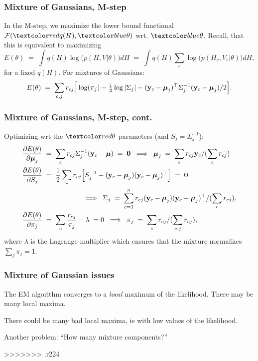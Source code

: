 \begin{frame}
\frametitle{Mixture of Gaussians, M-step}

In the M-step, we maximize the lower bound functional ${\cal
  F}(\Red{q(H)},\Blue{\theta})$ wrt. $\Blue{\theta}$. Recall, that this is 
equivalent to maximizing
%
\[
E(\theta)\;=\;\int q(H)\log\big(p(H,V|\theta)\big)dH\;=
\;\int q(H)\sum_c\log\big(p(H_c,V_c|\theta)\big)dH,
\]
%
for a fixed $q(H)$. For mixtures of Gaussians:
%
\[
E(\theta)\;=\;\sum_{c,j}r_{cj}\Big[\log(\pi_j)-\tfrac{1}{2}\log|\Sigma_j|
-(\mathbf y_c-{\boldsymbol{\mu}}_j)^\top\Sigma_j^{-1}(\mathbf y_c-{\boldsymbol{\mu}}_j)/2\Big].
\]
\end{frame}

\begin{frame}
\frametitle{Mixture of Gaussians, M-step, cont.}

Optimizing wrt the $\Red{\theta}$ parameters (and $S_j=\Sigma_j^{-1}$):
%
\[
\begin{split}
\frac{\partial E(\theta)}{\partial \bmu_j}\;&=\;\sum_c
r_{cj}\Sigma_j^{-1}(\bfy_c-\bmu)\;=\;{\bf 0}\;\;\Longrightarrow\;\;
\bmu_j\;=\;\sum_c r_{cj}\bfy_c/(\sum_c r_{cj})\\
\frac{\partial E(\theta)}{\partial
  S_j}\;&=\;\frac{1}{2}\sum_cr_{cj}\Big[S_j^{-1}-(\bfy_c-\bmu_j)(\bfy_c-\bmu_j
)^\top\Big]\;=\;{\bf  0}\\
&\hspace{20mm}\Longrightarrow\;\;
\Sigma_j\;=\;\sum_{c=1}^nr_{cj}(\bfy_c-\bmu_j)(\bfy_c-\bmu_j)^\top/(\sum_c r_{
cj}),\\
\frac{\partial E(\theta)}{\partial \pi_j}\;&=\;\sum_c\frac{r_{cj}}{\pi_j}-
\lambda\;=0\;\;\Longrightarrow\;\;\pi_j\;=\;\sum_cr_{cj}/(\sum_{c,j}r_{cj}),
\end{split}
\]
%
where $\lambda$ is the Lagrange multiplier which ensures that the mixture
normalizes $\sum_j\pi_j=1$.
\end{frame}

\begin{frame}
\frametitle{Mixture of Gaussian issues}

The EM algorithm converges to a \emph{local} maximum of the likelihood.
There may be many local maxima.

There could be many bad local maxima, ie with low values of the likelihood.


Another problem: ``How many mixture components?''
\end{frame}






>>>>>>> .r224
